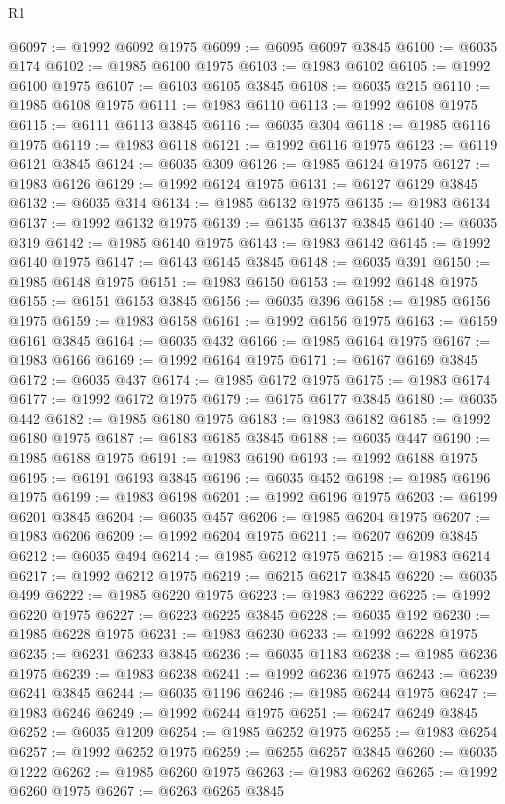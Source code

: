 \begin{lexlean}{R1}
\begin{coremodule}
@6097 := @1992 @6092 @1975
@6099 := @6095 @6097 @3845
@6100 := @6035 @174
@6102 := @1985 @6100 @1975
@6103 := @1983 @6102
@6105 := @1992 @6100 @1975
@6107 := @6103 @6105 @3845
@6108 := @6035 @215
@6110 := @1985 @6108 @1975
@6111 := @1983 @6110
@6113 := @1992 @6108 @1975
@6115 := @6111 @6113 @3845
@6116 := @6035 @304
@6118 := @1985 @6116 @1975
@6119 := @1983 @6118
@6121 := @1992 @6116 @1975
@6123 := @6119 @6121 @3845
@6124 := @6035 @309
@6126 := @1985 @6124 @1975
@6127 := @1983 @6126
@6129 := @1992 @6124 @1975
@6131 := @6127 @6129 @3845
@6132 := @6035 @314
@6134 := @1985 @6132 @1975
@6135 := @1983 @6134
@6137 := @1992 @6132 @1975
@6139 := @6135 @6137 @3845
@6140 := @6035 @319
@6142 := @1985 @6140 @1975
@6143 := @1983 @6142
@6145 := @1992 @6140 @1975
@6147 := @6143 @6145 @3845
@6148 := @6035 @391
@6150 := @1985 @6148 @1975
@6151 := @1983 @6150
@6153 := @1992 @6148 @1975
@6155 := @6151 @6153 @3845
@6156 := @6035 @396
@6158 := @1985 @6156 @1975
@6159 := @1983 @6158
@6161 := @1992 @6156 @1975
@6163 := @6159 @6161 @3845
@6164 := @6035 @432
@6166 := @1985 @6164 @1975
@6167 := @1983 @6166
@6169 := @1992 @6164 @1975
@6171 := @6167 @6169 @3845
@6172 := @6035 @437
@6174 := @1985 @6172 @1975
@6175 := @1983 @6174
@6177 := @1992 @6172 @1975
@6179 := @6175 @6177 @3845
@6180 := @6035 @442
@6182 := @1985 @6180 @1975
@6183 := @1983 @6182
@6185 := @1992 @6180 @1975
@6187 := @6183 @6185 @3845
@6188 := @6035 @447
@6190 := @1985 @6188 @1975
@6191 := @1983 @6190
@6193 := @1992 @6188 @1975
@6195 := @6191 @6193 @3845
@6196 := @6035 @452
@6198 := @1985 @6196 @1975
@6199 := @1983 @6198
@6201 := @1992 @6196 @1975
@6203 := @6199 @6201 @3845
@6204 := @6035 @457
@6206 := @1985 @6204 @1975
@6207 := @1983 @6206
@6209 := @1992 @6204 @1975
@6211 := @6207 @6209 @3845
@6212 := @6035 @494
@6214 := @1985 @6212 @1975
@6215 := @1983 @6214
@6217 := @1992 @6212 @1975
@6219 := @6215 @6217 @3845
@6220 := @6035 @499
@6222 := @1985 @6220 @1975
@6223 := @1983 @6222
@6225 := @1992 @6220 @1975
@6227 := @6223 @6225 @3845
@6228 := @6035 @192
@6230 := @1985 @6228 @1975
@6231 := @1983 @6230
@6233 := @1992 @6228 @1975
@6235 := @6231 @6233 @3845
@6236 := @6035 @1183
@6238 := @1985 @6236 @1975
@6239 := @1983 @6238
@6241 := @1992 @6236 @1975
@6243 := @6239 @6241 @3845
@6244 := @6035 @1196
@6246 := @1985 @6244 @1975
@6247 := @1983 @6246
@6249 := @1992 @6244 @1975
@6251 := @6247 @6249 @3845
@6252 := @6035 @1209
@6254 := @1985 @6252 @1975
@6255 := @1983 @6254
@6257 := @1992 @6252 @1975
@6259 := @6255 @6257 @3845
@6260 := @6035 @1222
@6262 := @1985 @6260 @1975
@6263 := @1983 @6262
@6265 := @1992 @6260 @1975
@6267 := @6263 @6265 @3845

\end{coremodule}
\end{lexlean}
